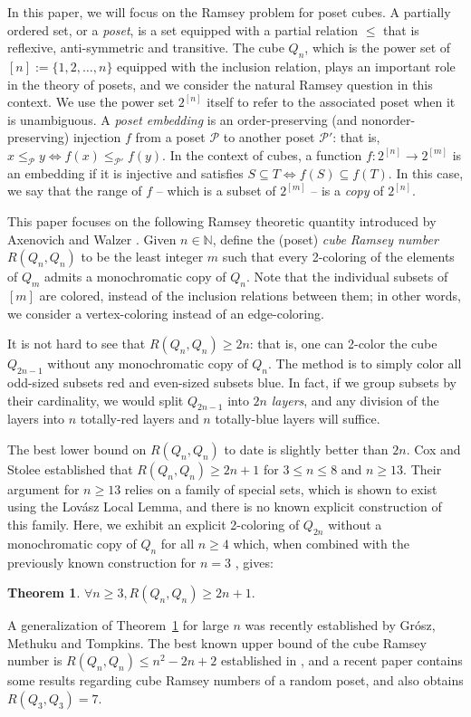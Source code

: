 \documentclass[12pt]{article}
\newtheorem{thm}{Theorem}[section]
\theoremstyle{definition}
\newcommand{\N}{\mathbb{N}}
\begin{document}
In this paper, we will focus on the Ramsey problem for poset cubes. A partially ordered set, or a \textit{poset}, is a set equipped with a partial relation $\le$ that is reflexive, anti-symmetric and transitive. The cube $Q_n$, which is the power set of $[n]:=\{1,2, \dots, n\}$ equipped with the inclusion relation, plays an important role in the theory of posets, and we consider the natural Ramsey question in this context. We use the power set $2^{[n]}$ itself to refer to the associated poset when it is unambiguous. A \textit{poset embedding} is an order-preserving (and nonorder-preserving) injection $f$ from a poset $\mathcal{P}$ to another poset $\mathcal{P}'$: that is, $x\le_\mathcal{P}y\iff f(x)\le_{\mathcal{P}'}f(y)$. In the context of cubes, a function $f:2^{[n]}\to2^{[m]}$ is an embedding if it is injective and satisfies $S\subseteq T\iff f(S)\subseteq f(T)$. In this case, we say that the range of $f$ -- which is a subset of $2^{[m]}$ -- is a \textit{copy} of $2^{[n]}$.

This paper focuses on the following Ramsey theoretic quantity introduced by Axenovich and Walzer \cite{axenovich2017boolean}. Given $n\in\N$, define the (poset) \textit{cube Ramsey number} $R(Q_n,Q_n)$ to be the least integer $m$ such that every 2-coloring of the elements of $Q_m$ admits a monochromatic copy of $Q_n$. Note that the individual subsets of $[m]$ are colored, instead of the inclusion relations between them; in other words, we consider a vertex-coloring instead of an edge-coloring. 

It is not hard to see that $R(Q_n,Q_n)\ge 2n$: that is, one can 2-color the cube $Q_{2n-1}$ without any monochromatic copy of $Q_n$. The method is to simply color all odd-sized subsets red and even-sized subsets blue. In fact, if we group subsets by their cardinality, we would split $Q_{2n-1}$ into $2n$ \textit{layers}, and any division of the layers into $n$ totally-red layers and $n$ totally-blue layers will suffice.

The best lower bound on $R(Q_n,Q_n)$ to date is slightly better than $2n$. Cox and Stolee \cite{cox2018ramsey} established that $R(Q_n,Q_n)\ge 2n+1$ for $3\le n\le 8$ and $n\ge 13$. Their argument for $n\ge 13$ relies on a family of special sets, which is shown to exist using the Lovász Local Lemma, and there is no known explicit construction of this family. Here, we exhibit an explicit 2-coloring of $Q_{2n}$ without a monochromatic copy of  $Q_n$ for all $n\ge 4$ which, when combined with the previously known construction for $n=3$ \cite{axenovich2017boolean}, gives:
\begin{thm}\label{theorem:main}
$\forall n \ge 3, R(Q_n,Q_n)\ge 2n+1.$
\end{thm}
\noindent
A generalization of Theorem~\ref{theorem:main} for large $n$ was recently established by Gr\'osz, Methuku and Tompkins\cite{new}. The best known upper bound of the cube Ramsey number is $R(Q_n,Q_n)\le n^2-2n+2$ established in \cite{lu2019poset}, and a recent paper \cite{falgas2020existence} contains some results regarding cube Ramsey numbers of a random poset, and also obtains $R(Q_3,Q_3)=7$. 
\end{document}
